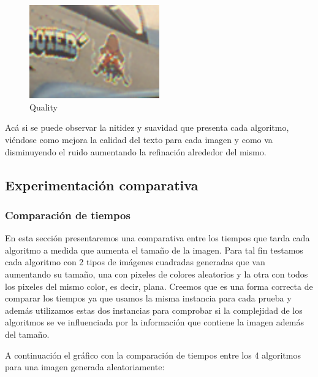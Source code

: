{\begin{figure}
\begin{center}
       \includegraphics[width=0.5\textwidth]{imagenes/img9_demosicing_quality_cropped.png}
        \caption{Quality}
\end{center}
\end{figure}


Acá si se puede observar la nitidez y suavidad que presenta cada algoritmo, viéndose como mejora la calidad del texto para cada imagen y como va disminuyendo el ruido aumentando la refinación alrededor del mismo.

\newpage


\subsection{Experimentación comparativa}

\subsubsection{Comparación de tiempos}

En esta sección presentaremos una comparativa entre los tiempos que tarda cada algoritmo a medida que aumenta el tamaño de la imagen. Para tal fin testamos cada algoritmo con 2 tipos de imágenes cuadradas generadas que van aumentando su tamaño, una con pixeles de colores aleatorios y la otra con todos los pixeles del mismo color, es decir, plana. Creemos que es una forma correcta de comparar los tiempos ya que usamos la misma instancia para cada prueba y además utilizamos estas dos instancias para comprobar si la complejidad de los algoritmos se ve influenciada por la información que contiene la imagen además del tamaño.

A continuación el gráfico con la comparación de tiempos entre los 4 algoritmos para una imagen generada aleatoriamente:


}
